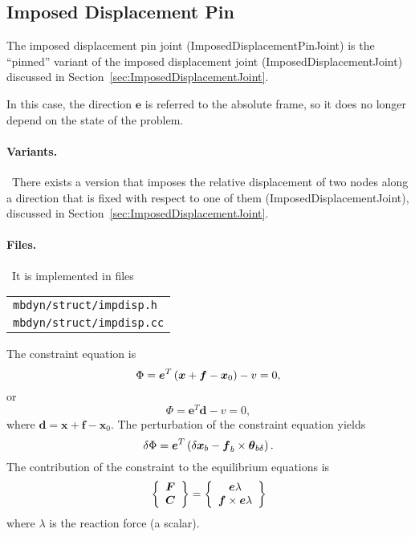 \documentclass[10pt,dvips,fleqn]{report}
\newcommand{\T}[1]{\boldsymbol{#1}}
\begin{document}
\subsection{Imposed Displacement Pin}
\label{sec:ImposedDisplacementPinJoint}
The imposed displacement pin joint (ImposedDisplacementPinJoint) 
is the ``pinned'' variant of the imposed displacement joint
(ImposedDisplacementJoint) discussed
in Section~\ref{sec:ImposedDisplacementJoint}.

In this case, the direction $\T{e}$ is referred to the absolute frame,
so it does no longer depend on the state of the problem.

\paragraph{Variants.} \
There exists a version that imposes the relative displacement of two nodes
along a direction that is fixed with respect to one of them 
(ImposedDisplacementJoint),
discussed in Section~\ref{sec:ImposedDisplacementJoint}.

\paragraph{Files.} \
It is implemented in files

\begin{tabular}{l}
\texttt{mbdyn/struct/impdisp.h} \\
\texttt{mbdyn/struct/impdisp.cc}
\end{tabular}

The constraint equation is
\begin{equation}
	\Phi = \T{e}^T \plbr{\T{x} + \T{f} - \T{x}_0} - v = 0 ,
\end{equation}
or
\begin{equation}
	\Phi = \T{e}^T \T{d} - v = 0 ,
\end{equation}
where $\T{d}=\T{x} + \T{f} - \T{x}_0$.
The perturbation of the constraint equation yields
\begin{equation}
	\delta\Phi = 
		\T{e}^T \plbr{\delta\T{x}_b
		- \T{f}_b\times\T{\theta}_{b\delta}
		} .
\end{equation}
The contribution of the constraint to the equilibrium equations is
\begin{equation}
	\cubr{\cvvect{
		\T{F} \\
		\T{C}
	}} = \cubr{\cvvect{
		\T{e} \lambda \\
		\T{f} \times \T{e} \lambda
	}}
\end{equation}
where $\lambda$ is the reaction force (a scalar).
\end{document}
